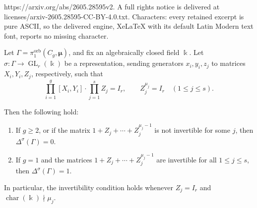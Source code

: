\documentclass[10pt,a4paper]{amsart}
\DeclareMathOperator{\GL}{GL}
\DeclareMathOperator{\ch}{char}
\DeclareMathOperator{\orb}{orb}
\renewcommand{\k}{\Bbbk}
\begin{document}
https://arxiv.org/abs/2605.28595v2. A full rights notice is delivered at licenses/arxiv-2605.28595-CC-BY-4.0.txt. Characters: every retained excerpt is pure ASCII, so the delivered engine, XeLaTeX with its default Latin Modern text font, reports no missing character.
\begin{proposition}
\label{prop:compact-orbifold-group}
Let $\Gamma=\pi_1^{\orb}(C_g,\bm{\mu})$, and fix an algebraically
closed field $\k$. Let $\sigma \colon \Gamma \to \GL_r(\k)$ 
be a representation, sending generators $x_i,y_i,z_j$ to matrices
$X_i,Y_i,Z_j$, respectively, such that
\[
\prod_{i=1}^{g}[X_i,Y_i]\cdot \prod_{j=1}^{s} Z_j = I_r,
\qquad
Z_j^{\mu_j}=I_r \quad (1\le j\le s).
\]

Then the following hold:
\begin{enumerate}
\item If $g\ge 2$, or if the matrix $1+Z_j+\cdots+Z_j^{\mu_j-1}$ 
is not invertible for some $j$, then $\Delta^\sigma(\Gamma)=0$.

\item If $g=1$ and the matrices $1+Z_j+\cdots+Z_j^{\mu_j-1}$ 
are invertible for all $1\le j\le s$, then $\Delta^\sigma(\Gamma)=1$.
\end{enumerate}

In particular, the invertibility condition holds whenever
$Z_j=I_r$ and $\ch(\k)\nmid \mu_j$.
\end{proposition}    
\end{document}
